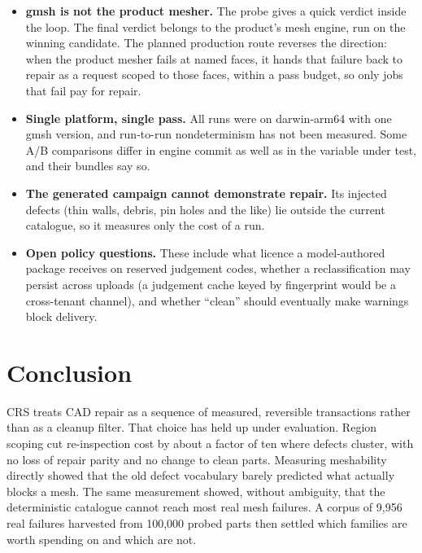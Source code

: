 \documentclass[11pt,onecolumn]{article}
\begin{document}
\begin{itemize}
        text. The loop is therefore unmeasured in production by construction, and the vertex-moving
        operations stay reviewer-gated under every posture value.
  \item \textbf{gmsh is not the product mesher.} The probe gives a quick verdict inside the loop.
        The final verdict belongs to the product's mesh engine, run on the winning candidate. The
        planned production route reverses the direction: when the product mesher fails at named
        faces, it hands that failure back to repair as a request scoped to those faces, within a
        pass budget, so only jobs that fail pay for repair.
  \item \textbf{Single platform, single pass.} All runs were on darwin-arm64 with one gmsh version,
        and run-to-run nondeterminism has not been measured. Some A/B comparisons differ in engine
        commit as well as in the variable under test, and their bundles say so.
  \item \textbf{The generated campaign cannot demonstrate repair.} Its injected defects (thin walls,
        debris, pin holes and the like) lie outside the current catalogue, so it measures only the
        cost of a run.
  \item \textbf{Open policy questions.} These include what licence a model-authored package receives
        on reserved judgement codes, whether a reclassification may persist across uploads (a
        judgement cache keyed by fingerprint would be a cross-tenant channel), and whether ``clean''
        should eventually make warnings block delivery.
\end{itemize}

\section{Conclusion}\label{sec:conclusion}

CRS treats CAD repair as a sequence of measured, reversible transactions rather than as a cleanup
filter. That choice has held up under evaluation. Region scoping cut re-inspection cost by about a
factor of ten where defects cluster, with no loss of repair parity and no change to clean parts.
Measuring meshability directly showed that the old defect vocabulary barely predicted what actually
blocks a mesh. The same measurement showed, without ambiguity, that the deterministic catalogue
cannot reach most real mesh failures. A corpus of 9{,}956 real failures harvested from 100{,}000
probed parts then settled which families are worth spending on and which are not.
\end{document}
